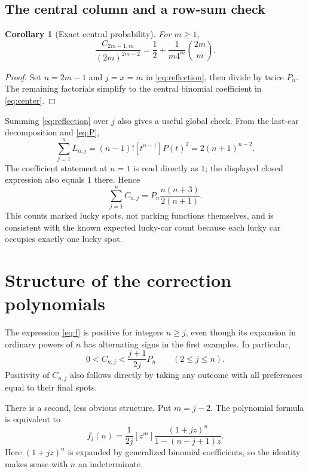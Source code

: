 \documentclass[11pt,letterpaper]{article}
\numberwithin{equation}{section}
\newtheorem{corollary}[theorem]{Corollary}
\theoremstyle{definition}
\begin{document}
\subsection{The central column and a row-sum check}
\begin{corollary}[Exact central probability]\label{cor:center}
For $m\ge1$,
\begin{equation}\label{eq:center}
 \frac{C_{2m-1,m}}{(2m)^{2m-2}}
      =\frac12+\frac1{m4^m}\binom{2m}{m}.
\end{equation}
\end{corollary}
\begin{proof}
Set $n=2m-1$ and $j=x=m$ in \eqref{eq:reflection}, then divide by twice
$P_n$. The remaining factorials simplify to the central binomial
coefficient in \eqref{eq:center}.
\end{proof}

Summing \eqref{eq:reflection} over $j$ also gives a useful global check.
From the last-car decomposition and \eqref{eq:P},
\[
 \sum_{j=1}^n L_{n,j}
  =(n-1)![t^{n-1}]P(t)^2=2(n+1)^{n-2}.
\]
The coefficient statement at $n=1$ is read directly as $1$; the displayed
closed expression also equals $1$ there. Hence
\begin{equation}\label{eq:row-sum}
 \sum_{j=1}^n C_{n,j}
    =P_n\frac{n(n+3)}{2(n+1)}.
\end{equation}
This counts marked lucky spots, not parking functions themselves, and is
consistent with the known expected lucky-car count because each lucky car
occupies exactly one lucky spot.

\section{Structure of the correction polynomials}
\label{sec:polynomials}

The expression \eqref{eq:f} is positive for integers $n\ge j$, even though
its expansion in ordinary powers of $n$ has alternating signs in the first
examples. In particular,
\[
 0<C_{n,j}<\frac{j+1}{2j}P_n\qquad(2\le j\le n).
\]
Positivity of $C_{n,j}$ also follows directly by taking any outcome with
all preferences equal to their final spots.

There is a second, less obvious structure. Put $m=j-2$. The polynomial
formula is equivalent to
\begin{equation}\label{eq:coefficient-polynomial}
 f_j(n)=\frac1{2j}[z^m]\frac{(1+jz)^n}{1-(n-j+1)z}.
\end{equation}
Here $(1+jz)^n$ is expanded by generalized binomial coefficients, so the
identity makes sense with $n$ an indeterminate.
\end{document}
